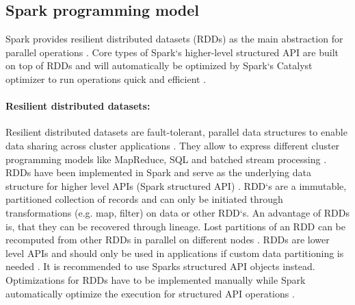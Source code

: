 \subsection{Spark programming model}
\label{sec:spark_programming_model}
Spark provides resilient distributed datasets (RDDs) as the main abstraction for parallel operations \cite{Zaharia2010Spark}. Core types of Spark`s higher-level structured API are built on top of RDDs \cite{Chambers2018Spark} and will automatically be optimized by Spark`s Catalyst optimizer to run operations quick and efficient \cite{Hien2018Spark}.


\paragraph{Resilient distributed datasets:}
Resilient distributed datasets are fault-tolerant, parallel data structures to enable data sharing across cluster applications \cite{Zaharia2012RDDs}. They allow to express different cluster programming models like MapReduce, SQL and batched stream processing \cite{Zaharia2012RDDs}. RDDs have been implemented in Spark and serve as the underlying data structure for higher level APIs (Spark structured API) \cite{Zaharia2012RDDs}.
RDD`s are a immutable, partitioned collection of records and can only be initiated through transformations (e.g. map, filter) on data or other RDD`s.
An advantage of RDDs is, that they can be recovered through lineage. Lost partitions of an RDD can be recomputed from other RDDs in parallel on different nodes \cite{Zaharia2012RDDs}. 
RDDs are lower level APIs and should only be used in applications if custom data partitioning is needed \cite{Chambers2018Spark}. It is recommended to use Sparks structured API objects instead. Optimizations for RDDs have to be implemented manually while Spark automatically optimize the execution for structured API operations \cite{Chambers2018Spark}.


